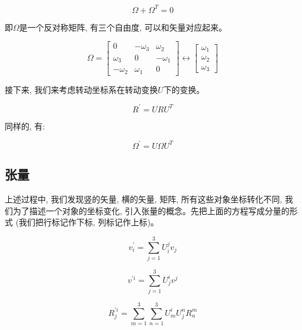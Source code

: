 \documentclass{ctexart}
\numberwithin{equation}{subsection}
\numberwithin{theorem}{subsection}
\numberwithin{definition}{subsection}
\numberwithin{proof}{subsection}
\numberwithin{lemma}{subsection}
\numberwithin{example}{subsection}
\numberwithin{remark}{subsection}
\numberwithin{corollary}{subsection}
\numberwithin{exercise}{subsection}
\numberwithin{problem}{subsection}
\numberwithin{question}{section}
\numberwithin{method}{subsection}
\begin{document}
    \begin{equation}
        \Omega + \Omega^T = 0
    \end{equation}

    即$\Omega$是一个反对称矩阵, 有三个自由度, 可以和矢量对应起来。

    \begin{equation}
        \Omega = \begin{bmatrix}
            0 & -\omega_3 & \omega_2 \\
            \omega_3 & 0 & -\omega_1 \\
            -\omega_2 & \omega_1 & 0
        \end{bmatrix} \leftrightarrow \begin{bmatrix}
            \omega_1 \\ \omega_2 \\ \omega_3
        \end{bmatrix}
    \end{equation}

    接下来, 我们来考虑转动坐标系在转动变换$U$下的变换。

    \begin{equation}
        R^\prime = U R U^T
    \end{equation}

    同样的, 有:

    \begin{equation}
        \Omega^\prime = U \Omega U^T
    \end{equation}

    \subsection{张量}

    上述过程中, 我们发现竖的矢量, 横的矢量, 矩阵, 所有这些对象坐标转化不同, 
    我们为了描述一个对象的坐标变化, 引入张量的概念。先把上面的方程写成分量的形式
    (我们把行标记作下标, 列标记作上标)。

    \begin{equation}
        v^\prime_i = \sum_{j=1}^3 U^j_i v_j
    \end{equation}

    \begin{equation}
        v^{\prime i} = \sum_{j=1}^3 U^i_j v^j
    \end{equation}

    \begin{equation}
        R^{\prime i}_j = \sum_{m=1}^3 \sum_{n=1}^3 U^i_m U^n_j R^m_n
    \end{equation}
\end{document}
